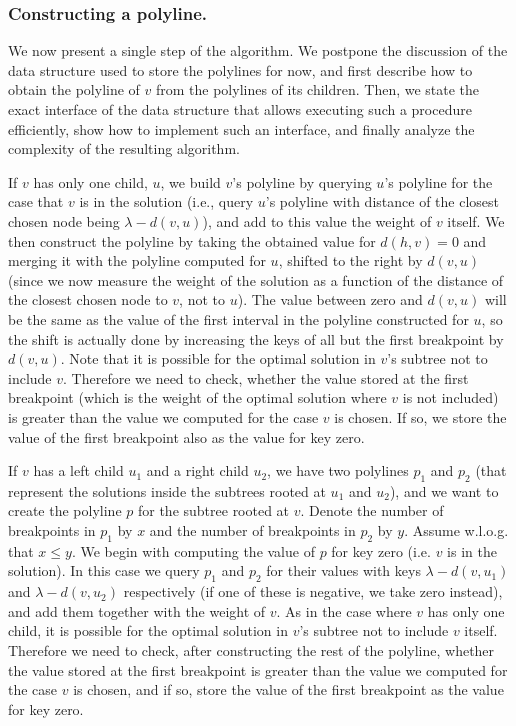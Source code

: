 \documentclass[11pt,a4paper]{article}
\theoremstyle{definition}
\theoremstyle{remark}
\begin{document}
\subsubsection{Constructing a polyline.} We now present a single step of the algorithm. We postpone the discussion of the data structure used to store the polylines for now, and first describe how to obtain the polyline of $v$ from the polylines of its children. Then, we state the exact interface of the data structure that allows executing such a procedure efficiently, show how to implement such an interface, and finally analyze the complexity of the resulting algorithm.

If $v$ has only one child, $u$, we build $v$'s polyline by querying $u$'s polyline for the case that $v$ is in the solution (i.e., query $u$'s polyline with distance of the closest chosen node being $\lambda-d(v,u)$), and add to this value the weight of $v$ itself. We then construct the polyline by taking the obtained value for $d(h,v)=0$ and merging it with the polyline computed for $u$, shifted to the right by $d(v,u)$ (since we now measure the weight of the solution as a function of the distance of the closest chosen node to $v$, not to $u$). The value between zero and $d(v,u)$ will be the same as the value of the first interval in the polyline constructed for $u$, so the shift is actually done by increasing the keys of all but the first breakpoint by $d(v,u)$. Note that it is possible for the optimal solution in $v$'s subtree not to include $v$. Therefore we need to check, whether the value stored at the first breakpoint (which is the weight of the optimal solution where $v$ is not included) is greater than the value we computed for the case $v$ is chosen. If so, we store the value of the first breakpoint also as the value for key zero.

If $v$ has a left child $u_1$ and a right child  $u_2$, we have two polylines $p_1$ and $p_2$ (that represent the solutions inside the subtrees rooted at $u_1$ and $u_2$), and we want to create the polyline $p$ for the subtree rooted at $v$. Denote the number of breakpoints in $p_1$ by $x$ and the number of breakpoints in $p_2$ by $y$. Assume w.l.o.g. that $x \leq y$.
%
We begin with computing the value of $p$ for key zero (i.e. $v$ is in the solution). In this case we query $p_1$ and $p_2$ for their values with keys $\lambda - d(v,u_1)$ and $\lambda - d(v,u_2)$ respectively (if one of these is negative, we take zero instead), and add them together with the weight of $v$. As in the case where $v$ has only one child, it is possible for the optimal solution in $v$'s subtree not to include $v$ itself. Therefore we need to check, after constructing the rest of the polyline, whether the value stored at the first breakpoint is greater than the value we computed for the case $v$ is chosen, and if so, store the value of the first breakpoint as the value for key zero.
\end{document}
